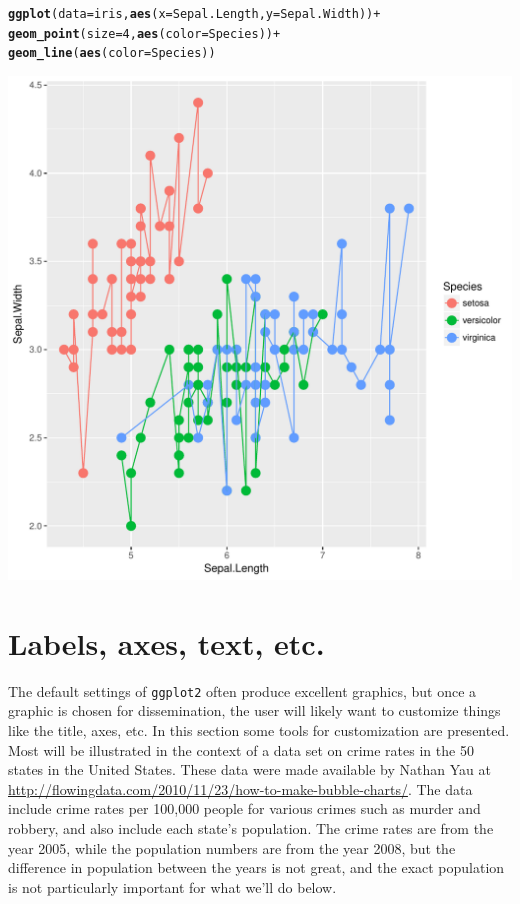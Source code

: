 \documentclass[12pt,oneside]{book}\usepackage[]{graphicx}\usepackage[]{color}
\makeatletter
\def\maxwidth{ %
  \ifdim\Gin@nat@width>\linewidth
    \linewidth
  \else
    \Gin@nat@width
  \fi
}
\newcommand{\hlnum}[1]{\textcolor[rgb]{0.686,0.059,0.569}{#1}}%
\newcommand{\hlopt}[1]{\textcolor[rgb]{0,0,0}{#1}}%
\newcommand{\hlstd}[1]{\textcolor[rgb]{0.345,0.345,0.345}{#1}}%
\newcommand{\hlkwc}[1]{\textcolor[rgb]{0.333,0.667,0.333}{#1}}%
\newcommand{\hlkwd}[1]{\textcolor[rgb]{0.737,0.353,0.396}{\textbf{#1}}}%
\newenvironment{kframe}{%
 \def\at@end@of@kframe{}%
 \ifinner\ifhmode%
  \def\at@end@of@kframe{\end{minipage}}%
  \begin{minipage}{\columnwidth}%
 \fi\fi%
 \def\FrameCommand##1{\hskip\@totalleftmargin \hskip-\fboxsep
 \colorbox{shadecolor}{##1}\hskip-\fboxsep
     \hskip-\linewidth \hskip-\@totalleftmargin \hskip\columnwidth}%
 \MakeFramed {\advance\hsize-\width
   \@totalleftmargin\z@ \linewidth\hsize
   \@setminipage}}%
 {\par\unskip\endMakeFramed%
 \at@end@of@kframe}
\newenvironment{knitrout}{}{} %
\makeatother
\begin{document}
\begin{knitrout}
\color{fgcolor}\begin{kframe}
\begin{alltt}
\hlkwd{ggplot}\hlstd{(}\hlkwc{data} \hlstd{= iris,} \hlkwd{aes}\hlstd{(}\hlkwc{x} \hlstd{= Sepal.Length,} \hlkwc{y} \hlstd{= Sepal.Width))} \hlopt{+}
    \hlkwd{geom_point}\hlstd{(}\hlkwc{size} \hlstd{=} \hlnum{4}\hlstd{,} \hlkwd{aes}\hlstd{(}\hlkwc{color}\hlstd{=Species))} \hlopt{+}
    \hlkwd{geom_line}\hlstd{(}\hlkwd{aes}\hlstd{(}\hlkwc{color}\hlstd{=Species))}
\end{alltt}
\end{kframe}
\includegraphics[width=\maxwidth]{figure/unnamed-chunk-69-1} 

\end{knitrout}

\section{Labels, axes, text, etc.}
The default settings of \verb+ggplot2+ often produce excellent graphics, but once a graphic is chosen for dissemination, the user will likely want to customize things like the title, axes, etc. In this section some tools for customization are presented. Most will be illustrated in the context of a data set on crime rates in the 50 states in the United States. These data were made available by Nathan Yau at \url{http://flowingdata.com/2010/11/23/how-to-make-bubble-charts/}. The data include crime rates per 100,000 people for various crimes such as murder and robbery, and also include each state's population. The crime rates are from the year 2005, while the population numbers are from the year 2008, but the difference in population between the years is not great, and the exact population is not particularly important for what we'll do below.
\end{document}
